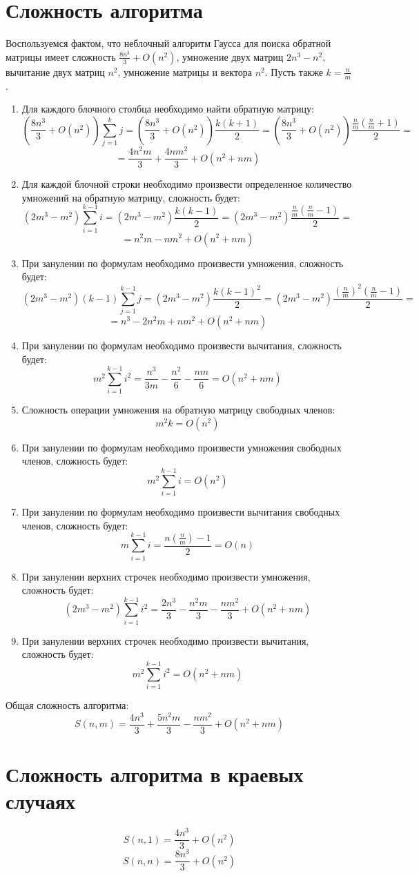 \documentclass[a4paper,12pt]{article}
\begin{document}
\section{Сложность алгоритма}
Воспользуемся фактом, что неблочный алгоритм Гаусса для поиска обратной матрицы имеет сложность $\frac{8n^3}{3}+O(n^2)$,  умножение двух матриц $2n^3-n^2$, вычитание двух матриц $n^2$, умножение матрицы и вектора $n^2$. Пусть также $k=\frac{n}{m}$.
\begin{enumerate}
    \item Для каждого блочного столбца необходимо найти обратную матрицу: 
$$
    (\frac{8n^3}{3}+O(n^2))\sum^k_{j=1}j=(\frac{8n^3}{3}+O(n^2))\frac{k(k+1)}{2}=(\frac{8n^3}{3}+O(n^2))\frac{\frac{n}{m}(\frac{n}{m}+1)}{2}=
$$
$$
=\frac{4n^2m}{3}+\frac{4nm^2}{3}+O(n^2+nm)
$$
    \item Для каждой блочной строки необходимо произвести определенное количество умножений на обратную матрицу, сложность будет: 
$$
    (2m^3-m^2)\sum^{k-1}_{i=1}i=(2m^3-m^2)\frac{k(k-1)}{2}=(2m^3-m^2)\frac{\frac{n}{m}(\frac{n}{m}-1)}{2}=
$$
$$
=n^2m-nm^2+O(n^2+nm)
$$
    \item При занулении по формулам необходимо произвести умножения, сложность будет: 
$$
    (2m^3-m^2)(k-1)\sum^{k-1}_{j=1}j=(2m^3-m^2)\frac{k(k-1)^2}{2}=(2m^3-m^2)\frac{(\frac{n}{m})^2(\frac{n}{m}-1)}{2}=
$$
$$
    =n^3-2n^2m+nm^2+O(n^2+nm)
$$
    \item   При занулении по формулам необходимо произвести вычитания, сложность будет:
$$
    m^2\sum^{k-1}_{i=1}i^2=\frac{n^3}{3m}-\frac{n^2}{6}-\frac{nm}{6}=O(n^2+nm)
$$
\item Сложность операции умножения на обратную матрицу свободных членов:
$$
    m^2k=O(n^2)
$$
\item При занулении по формулам необходимо произвести умножения свободных членов, сложность будет:
$$
    m^2\sum^{k-1}_{i=1}i=O(n^2)
$$
\item При занулении по формулам необходимо произвести вычитания свободных членов, сложность будет:
$$
    m\sum^{k-1}_{i=1}i=\frac{n(\frac{n}{m})-1}{2}=O(n)
$$
\item При занулении верхних строчек необходимо произвести умножения, сложность будет:
$$
    (2m^3-m^2)\sum^{k-1}_{i=1}i^2=\frac{2n^3}{3}-\frac{n^2m}{3}-\frac{nm^2}{3}+O(n^2+nm)
$$
\item При занулении верхних строчек необходимо произвести вычитания, сложность будет:
$$
    m^2\sum^{k-1}_{i=1}i^2=O(n^2+nm)
$$
\end{enumerate}
Общая сложность алгоритма:
$$
    S(n,m)=\frac{4n^3}{3}+\frac{5n^2m}{3}-\frac{nm^2}{3}+O(n^2+nm)
$$
\section{Сложность алгоритма в краевых случаях}
$$
    S(n,1)=\frac{4n^3}{3}+O(n^2)
$$
$$
    S(n,n)=\frac{8n^3}{3}+O(n^2)
$$
\end{document}
